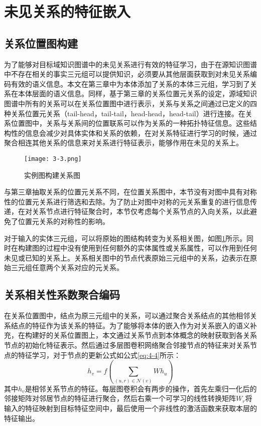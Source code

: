 \section{未见关系的特征嵌入}
\subsection{关系位置图构建}
为了能够对目标域知识图谱中的未见关系进行有效的特征学习，由于在源知识图谱中不存在相关的事实三元组可以提供知识，必须要从其他层面获取到对未见关系编码有效的语义信息。本文在第三章中为本体添加了关系的本体三元组，学习到了关系在本体层面的语义信息。同样，基于第三章的关系位置元关系的设定，源域知识图谱中所有的关系可以在关系位置图中进行表示，关系与关系之间通过已定义的四种关系位置元关系（tail-head，tail-tail，head-head，head-tail）进行连接。在关系位置图中，关系与关系间的位置联系可以作为关系的一种拓扑特征信息。这些结构性的信息会减少对具体实体和关系的依赖，在对关系特征进行学习的时候，通过聚合相连其他关系的信息来对关系进行特征表示，能够作用在未见的关系上。
\begin{figure}[h]
  \centering
  \texttt{[image: 3-3.png]}
  \caption{实例图构建关系图}
  \label{fig:3-3}
\end{figure}

与第三章抽取关系的位置元关系不同，在位置关系图中，本节没有对图中具有对称性的位置元关系进行筛选和去除。为了防止对图中对称的元关系重复的进行信息传递，在对关系节点进行特征聚合时，本节仅考虑每个关系节点的入向关系，以此避免了位置元关系的对称性的影响。

对于输入的实体三元组，可以将原始的图结构转变为关系相关图，如图\ref{fig:3-3}所示。同时在构建图的过程中没有使用到任何额外的实体属性或关系属性，可以作用到任何未见或已知的关系上。关系相关图中的节点代表原始三元组中的关系，边表示在原始三元组任意两个关系对应的元关系。

\subsection{关系相关性系数聚合编码}
在关系位置图中，结点为原三元组中的关系，可以通过聚合关系结点的其他相邻关系结点的特征作为该关系的特征。为了能够将本体的嵌入作为对关系嵌入的语义补充，在构建好的关系位置图上，本文通过关系节点到本体概念的映射获取到各关系节点的初始化特征表示。然后通过多层图卷积网络聚合邻接节点的特征来对关系节点的特征学习，对于节点的更新公式如公式\ref{eq:4-4}所示：
\begin{equation}
  h_{v} = f\left( \sum_{(u,r) \in \mathcal{N}(v)} W h_{u}\right) \label{eq:4-4}
\end{equation}
其中\(h_{v}\)是相邻关系节点的特征。每层图卷积会有两步的操作，首先左乘归一化后的邻接矩阵对邻居节点的特征进行聚合，然后右乘一个可学习的线性转换矩阵\(W_{r}\)将输入的特征映射到目标特征空间中，最后使用一个非线性的激活函数来获取本层的特征输出。

